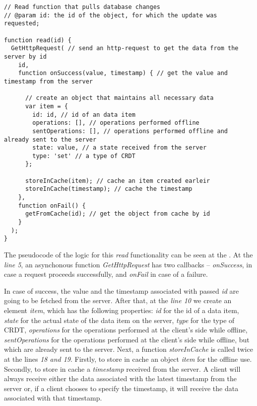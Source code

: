 \begin{lstlisting}[caption={Pseudocode for requesting the data: client.}, label={lst:read1}]
// Read function that pulls database changes
// @param id: the id of the object, for which the update was requested;

function read(id) {
  GetHttpRequest( // send an http-request to get the data from the server by id
    id,
    function onSuccess(value, timestamp) { // get the value and timestamp from the server

      // create an object that maintains all necessary data
      var item = {
        id: id, // id of an data item
        operations: [], // operations performed offline
        sentOperations: [], // operations performed offline and already sent to the server
        state: value, // a state received from the server
        type: 'set' // a type of CRDT
      }; 

      storeInCache(item); // cache an item created earleir
      storeInCache(timestamp); // cache the timestamp
    },
    function onFail() {
      getFromCache(id); // get the object from cache by id
    }
  );
}
\end{lstlisting} 

The pseudocode of the logic for this \textit{read} functionality can be seen at the . At the \textit{line 5}, an asynchonous function \textit{GetHttpRequest} has two callbacks -- \textit{onSuccess}, in case a request proceeds successfully, and \textit{onFail} in case of a failure. 

In case of success, the value and the timestamp associated with passed \textit{id} are going to be fetched from the server. After that, at the \textit{line 10} we create an element \textit{item}, which has the following properties: \textit{id} for the id of a data item, \textit{state} for the actual state of the data item on the server, \textit{type} for the type of CRDT, \textit{operations} for the operations performed at the client's side while offline, \textit{sentOperations} for the operations performed at the client's side while offline, but which are already sent to the server. Next, a function \textit{storeInCache} is called twice at the lines \textit{18 and 19}. Firstly, to store in cache an object \textit{item} for the offline use. Secondly, to store in cache a \textit{timestamp} received from the server.  A client will always receive either the data associated with the latest timestamp from the server or, if a client chooses to specify the timestamp, it will receive the data associated with that timestamp. 

